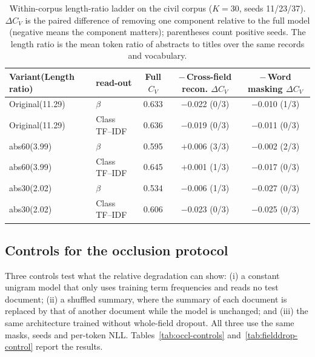 \documentclass[11pt]{article}
\begin{document}
\begin{table}[t]
\centering
\caption{Within-corpus length-ratio ladder on the civil corpus ($K=30$, seeds 11/23/37). $\Delta C_V$ is the paired difference of removing one component relative to the full model (negative means the component matters); parentheses count positive seeds. The length ratio is the mean token ratio of abstracts to titles over the same records and vocabulary.}
\label{tab:ladder}
\small
\setlength{\tabcolsep}{4pt}
\begin{tabular}{@{}llccc@{}}
\toprule
Variant(Length ratio) & read-out & Full $C_V$ & $-\hspace{2pt}$Cross-field recon. $\Delta C_V$
 & $-\hspace{2pt}$Word masking $\Delta C_V$ \\
\midrule
Original(11.29) & $\beta$ & 0.633 & $-$0.022 (0/3) & $-$0.010 (1/3) \\
Original(11.29) & Class TF--IDF & 0.636 & $-$0.019 (0/3) & $-$0.011 (0/3) \\
abs60(3.99) & $\beta$ & 0.595 & $+$0.006 (3/3) & $-$0.002 (2/3) \\
abs60(3.99) & Class TF--IDF & 0.645 & $+$0.001 (1/3) & $-$0.017 (0/3) \\
abs30(2.02) & $\beta$ & 0.534 & $-$0.006 (1/3) & $-$0.027 (0/3) \\
abs30(2.02) & Class TF--IDF & 0.606 & $-$0.023 (0/3) & $-$0.025 (0/3) \\
\bottomrule
\end{tabular}
\end{table}

\subsection{Controls for the occlusion protocol}

Three controls test what the relative degradation can show: (i) a constant unigram model that only
uses training term frequencies and reads no test document; (ii) a shuffled summary, where the
summary of each document is replaced by that of another document while the model is unchanged; and
(iii) the same architecture trained without whole-field dropout. All three use the same masks,
seeds and per-token NLL. Tables~\ref{tab:occl-controls} and~\ref{tab:fielddrop-control} report the
results.
\end{document}

